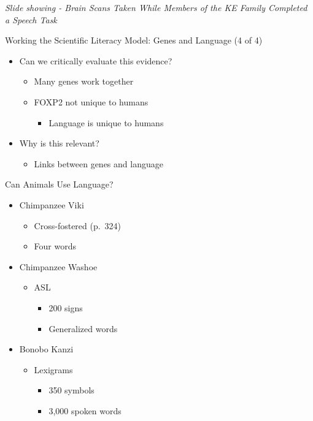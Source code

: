 \documentclass[
]{book}
\providecommand{\tightlist}{%
  \setlength{\itemsep}{0pt}\setlength{\parskip}{0pt}}
\begin{document}
\emph{Slide showing - Brain Scans Taken While Members of the KE Family Completed a Speech Task}

Working the Scientific Literacy Model: Genes and Language (4 of 4)

\begin{itemize}
\tightlist
\item
  Can we critically evaluate this evidence?

  \begin{itemize}
  \tightlist
  \item
    Many genes work together\\
  \item
    FOXP2 not unique to humans

    \begin{itemize}
    \tightlist
    \item
      Language is unique to humans
    \end{itemize}
  \end{itemize}
\item
  Why is this relevant?

  \begin{itemize}
  \tightlist
  \item
    Links between genes and language
  \end{itemize}
\end{itemize}

Can Animals Use Language?

\begin{itemize}
\tightlist
\item
  Chimpanzee Viki

  \begin{itemize}
  \tightlist
  \item
    Cross-fostered (p.~324)\\
  \item
    Four words
  \end{itemize}
\item
  Chimpanzee Washoe

  \begin{itemize}
  \tightlist
  \item
    ASL

    \begin{itemize}
    \tightlist
    \item
      200 signs\\
    \item
      Generalized words
    \end{itemize}
  \end{itemize}
\item
  Bonobo Kanzi

  \begin{itemize}
  \tightlist
  \item
    Lexigrams

    \begin{itemize}
    \tightlist
    \item
      350 symbols\\
    \item
      3,000 spoken words
    \end{itemize}
  \end{itemize}
\end{itemize}
\end{document}
